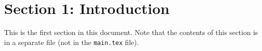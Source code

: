 \section[S1: First]{Section 1: Introduction}

This is the first section in this document. Note that the contents of this section is in a separate file (not in the \texttt{main.tex} file).


